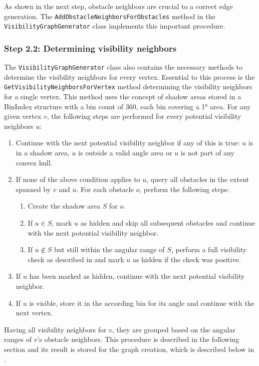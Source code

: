 			As shown in the next step, obstacle neighbors are crucial to a correct edge generation.
			The \texttt{AddObstacleNeighborsForObstacles} method in the \texttt{VisibilityGraphGenerator} class implements this important procedure.
			
		\subsubsection{Step 2.2: Determining visibility neighbors}
		
			The \texttt{VisibilityGraphGenerator} class also contains the necessary methods to determine the visibility neighbors for every vertex.
			Essential to this process is the \texttt{GetVisibilityNeighborsForVertex} method determining the visibility neighbors for a single vertex.
			This method uses the concept of shadow areas stored in a BinIndex structure with a bin count of 360, each bin covering a 1° area.
			For any given vertex $v$, the following steps are performed for every potential visibility neighbors $u$:
			\begin{enumerate}[leftmargin=2.25em+\widthof{2.2.},label={2.2.\arabic*.}]
				\item Continue with the next potential visibility neighbor if any of this is true: $u$ is in a shadow area, $u$ is outside a valid angle area or $u$ is not part of any convex hull.
				\item If none of the above condition applies to $u$, query all obstacles in the extent spanned by $v$ and $u$. For each obstacle $o$, perform the following steps:
				\begin{enumerate}[leftmargin=2.25em+\widthof{2.2.}-1em]
					\item Create the shadow area $S$ for $o$.
					\item If $u \in S$, mark $u$ as hidden and skip all subsequent obstacles and continue with the next potential visibility neighbor.
					\item If $u \not\in S$ but still within the angular range of $S$, perform a full visibility check as described in  and mark $u$ as hidden if the check was positive.
				\end{enumerate}
				\item If $u$ has been marked as hidden, continue with the next potential visibility neighbor.
				\item If $u$ is visible, store it in the according bin for its angle and continue with the next vertex.
			\end{enumerate}
			Having all visibility neighbors for $v$, they are grouped based on the angular ranges of $v$'s obstacle neighbors.
			This procedure is described in the following section and its result is stored for the graph creation, which is described below in .
		
